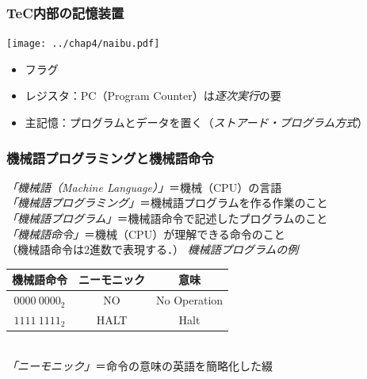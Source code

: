 \documentclass{beamer}                 %
\begin{document}
\begin{frame}
  \frametitle{TeC内部の記憶装置}
  \vfill
  \centerline{\texttt{[image: ../chap4/naibu.pdf]}}
  \vfill
  \begin{itemize}
    \item フラグ
    \item レジスタ：PC（Program Counter）は\emph{逐次実行}の要
    \item 主記憶：プログラムとデータを置く（\emph{ストアード・プログラム方式}）
  \end{itemize}
  \vfill
\end{frame}

\begin{frame}
  \frametitle{機械語プログラミングと機械語命令}
  \emph{「機械語（Machine Language）」}＝機械（CPU）の言語\\
  \vfill
  \vfill
  \emph{「機械語プログラミング」}＝機械語プログラムを作る作業のこと\\
  \vfill
  \emph{「機械語プログラム」}＝機械語命令で記述したプログラムのこと\\
  \vfill
  \emph{「機械語命令」}＝機械（CPU）が理解できる命令のこと\\
  （機械語命令は2進数で表現する．）
  \vfill
  \emph{機械語プログラムの例}\\
       {\ttfamily\small\begin{center}
         \begin{tabular}{|c|c|c|} \hline
           機械語命令 & ニーモニック & 意味\\
           \hline
           $0000~0000_{2}$ & NO & No Operation \\
           $1111~1111_{2}$ & HALT & Halt \\
           \hline
         \end{tabular}\\
       \emph{「ニーモニック」}＝命令の意味の英語を簡略化した綴
       \end{center}}
\end{frame}
\end{document}
